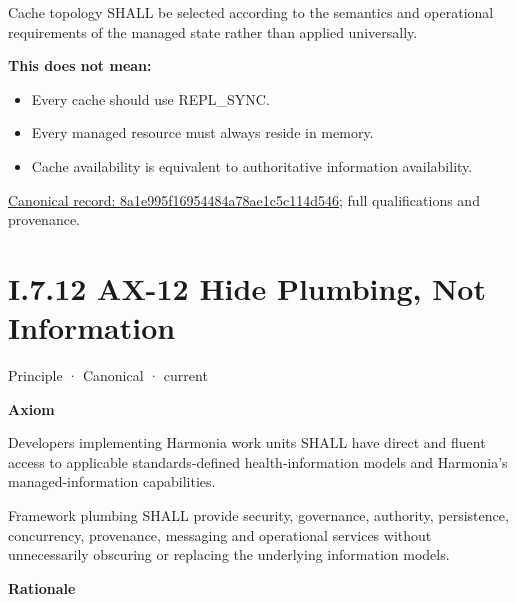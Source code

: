 Cache topology SHALL be selected according to the semantics and
operational requirements of the managed state rather than applied
universally.



\textbf{This does not mean:}



\begin{itemize}


\item Every cache should use REPL\_SYNC.

\item Every managed resource must always reside in memory.

\item Cache availability is equivalent to authoritative information availability.

\end{itemize}

{\footnotesize \href{../../../../continuum/motivation/principle/8a1e995f16954484a78ae1c5c114d546.md}{Canonical record: 8a1e995f16954484a78ae1c5c114d546}; full qualifications and provenance.}\par
\section*{I.7.12 AX-12 Hide Plumbing, Not Information}
\label{navigation:I.7.12}

\label{element:ce85889bd9b34f79a53d4c907ceb19d4}
{\small Principle · Canonical · current}\par

\par\medskip\textbf{Axiom}\par


Developers implementing Harmonia work units SHALL have direct and fluent
access to applicable standards-defined health-information models and
Harmonia's managed-information capabilities.



Framework plumbing SHALL provide security, governance, authority,
persistence, concurrency, provenance, messaging and operational services
without unnecessarily obscuring or replacing the underlying information
models.



\par\medskip\textbf{Rationale}\par


